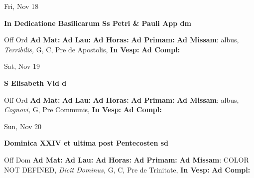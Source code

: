 \documentclass[10pt]{memoir}
\begin{document}
\begin{center}
\begin{minipage}{3.5in}
\vspace{2em}
\begin{center}Fri, Nov 18
\end{center}
\textbf{ \large In Dedicatione Basilicarum Ss Petri \& Pauli App
\textnormal{\normalsize dm}}

\begin{justify}Off Ord
\textbf{Ad Mat: }
\textbf{Ad Lau: }
\textbf{Ad Horas: }
\textbf{Ad Primam: }\textbf{Ad Missam}: albus, \textit{Terribilis,} G, C, Pre de Apostolis, 
\textbf{In Vesp: }
\textbf{Ad Compl: }
\end{justify}
\end{minipage}
\end{center}

\begin{center}
\begin{minipage}{3.5in}
\vspace{2em}
\begin{center}Sat, Nov 19
\end{center}
\textbf{ \large S Elisabeth Vid
\textnormal{\normalsize d}}

\begin{justify}Off Ord
\textbf{Ad Mat: }
\textbf{Ad Lau: }
\textbf{Ad Horas: }
\textbf{Ad Primam: }\textbf{Ad Missam}: albus, \textit{Cognovi,} G, Pre Communis, 
\textbf{In Vesp: }
\textbf{Ad Compl: }
\end{justify}
\end{minipage}
\end{center}

\begin{center}
\begin{minipage}{3.5in}
\vspace{2em}
\begin{center}Sun, Nov 20
\end{center}
\textbf{ \large Dominica XXIV et ultima post Pentecosten
\textnormal{\normalsize sd}}

\begin{justify}Off Dom
\textbf{Ad Mat: }
\textbf{Ad Lau: }
\textbf{Ad Horas: }
\textbf{Ad Primam: }\textbf{Ad Missam}: COLOR NOT DEFINED, \textit{Dicit Dominus,} G, C, Pre de Trinitate, 
\textbf{In Vesp: }
\textbf{Ad Compl: }
\end{justify}
\end{minipage}
\end{center}
\end{document}
